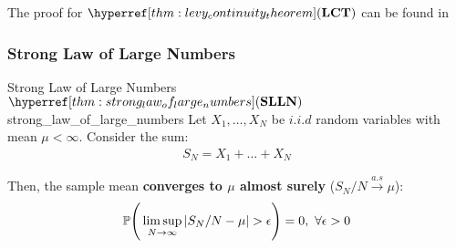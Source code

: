 \begin{proof*}
    The proof for $\LCT$ can be found in \cite[Section 9.1, Theorem 9.1 and Collorary 9.1]{book:allen2004}
\end{proof*}

\subsubsection{Strong Law of Large Numbers}
\begin{theorem}{Strong Law of Large Numbers $\SLLN$}{strong_law_of_large_numbers}
    Let $X_1, \dots, X_N$ be $i.i.d$ random variables with mean $\mu<\infty$. Consider the sum:
    \begin{align*}
        S_N = X_1 + \dots + X_N
    \end{align*}

    \noindent Then, the sample mean \textbf{converges to $\mu$ almost surely} ($S_N/N\xrightarrow{a.s}\mu$):
    \begin{align}
        \mathbb{P}\Bigg( 
            \limsup_{N\to\infty}|S_N/N - \mu| > \epsilon
         \Bigg) = 0, \ \forall \epsilon > 0
    \end{align}
\end{theorem}

